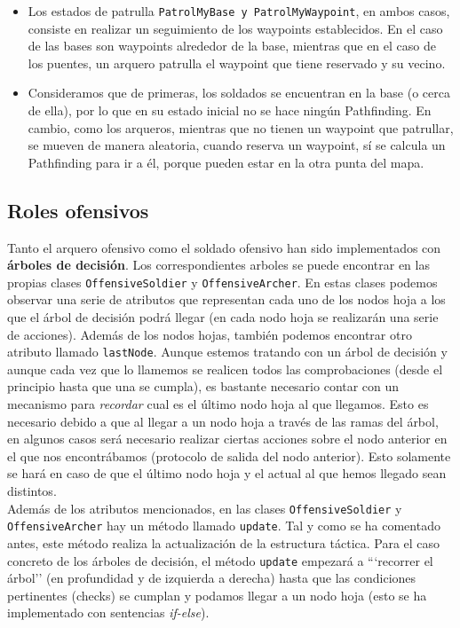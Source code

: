 \begin{itemize}
 \item Los estados de patrulla \texttt{PatrolMyBase y PatrolMyWaypoint}, en ambos casos, consiste en realizar un seguimiento de los waypoints establecidos. En el caso de las bases son waypoints alrededor de la base, mientras que en el caso de los puentes, un arquero patrulla el waypoint que tiene reservado y su vecino.
 
 \item Consideramos que de primeras, los soldados se encuentran en la base (o cerca de ella), por lo que en su estado inicial no se hace ningún Pathfinding. En cambio, como los arqueros, mientras que no tienen un waypoint que patrullar, se mueven de manera aleatoria, cuando reserva un waypoint, sí se calcula un Pathfinding para ir a él, porque pueden estar en la otra punta del mapa.
\end{itemize}


\medskip
\subsection{Roles ofensivos}
Tanto el arquero ofensivo como el soldado ofensivo han sido implementados con \textbf{árboles de decisión}. Los correspondientes arboles se puede encontrar en las propias clases \texttt{OffensiveSoldier} y \texttt{OffensiveArcher}. En estas clases podemos observar una serie de atributos que representan cada uno de los nodos hoja a los que el árbol de decisión podrá llegar (en cada nodo hoja se realizarán una serie de acciones). Además de los nodos hojas, también podemos encontrar otro atributo llamado \texttt{lastNode}. Aunque estemos tratando con un árbol de decisión y aunque cada vez que lo llamemos se realicen todos las comprobaciones (desde el principio hasta que una se cumpla), es bastante necesario contar con un mecanismo para \textit{recordar} cual es el último nodo hoja al que llegamos. Esto es necesario debido a que al llegar a un nodo hoja a través de las ramas del árbol, en algunos casos será necesario realizar ciertas acciones sobre el nodo anterior en el que nos encontrábamos (protocolo de salida del nodo anterior). Esto solamente se hará en caso de que el último nodo hoja y el actual al que hemos llegado sean distintos. \\

Además de los atributos mencionados, en las clases \texttt{OffensiveSoldier} y \texttt{OffensiveArcher} hay un método llamado \texttt{update}. Tal y como se ha comentado antes, este método realiza la actualización de la estructura táctica. Para el caso concreto de los árboles de decisión, el método \texttt{update} empezará a ```recorrer el árbol'' (en profundidad y de izquierda a derecha) hasta que las condiciones pertinentes (checks) se cumplan y podamos llegar a un nodo hoja (esto se ha implementado con sentencias \textit{if-else}). \\

